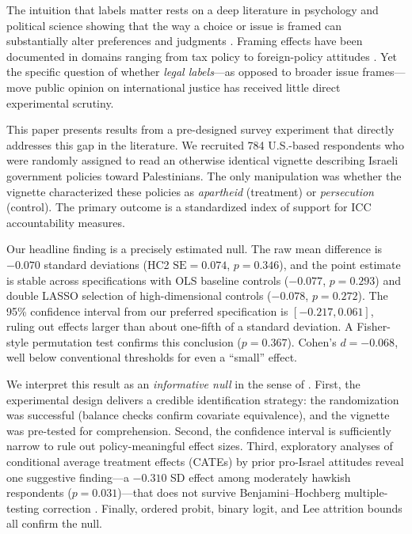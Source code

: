 \documentclass[12pt]{article}
\begin{document}
The intuition that labels matter rests on a deep literature in psychology and political science showing that the way a choice or issue is framed can substantially alter preferences and judgments \citep{kahneman1979prospect, chong2007framing, druckman2001implications}. Framing effects have been documented in domains ranging from tax policy \citep{nelson1997toward} to foreign-policy attitudes \citep{tomz2007experimental, kertzer2020experiments}. Yet the specific question of whether \emph{legal labels}---as opposed to broader issue frames---move public opinion on international justice has received little direct experimental scrutiny.

This paper presents results from a pre-designed survey experiment that directly addresses this gap in the literature. We recruited 784 U.S.-based respondents who were randomly assigned to read an otherwise identical vignette describing Israeli government policies toward Palestinians. The only manipulation was whether the vignette characterized these policies as \emph{apartheid} (treatment) or \emph{persecution} (control). The primary outcome is a standardized index of support for ICC accountability measures.

Our headline finding is a precisely estimated null. The raw mean difference is $-0.070$ standard deviations (HC2 $\text{SE} = 0.074$, $p = 0.346$), and the point estimate is stable across specifications with OLS baseline controls ($-0.077$, $p = 0.293$) and double LASSO selection of high-dimensional controls ($-0.078$, $p = 0.272$). The 95\% confidence interval from our preferred specification is $[-0.217, 0.061]$, ruling out effects larger than about one-fifth of a standard deviation. A Fisher-style permutation test confirms this conclusion ($p = 0.367$). Cohen's $d = -0.068$, well below conventional thresholds for even a ``small'' effect.

We interpret this result as an \emph{informative null} in the sense of \citet{lakens2017equivalence}. First, the experimental design delivers a credible identification strategy: the randomization was successful (balance checks confirm covariate equivalence), and the vignette was pre-tested for comprehension. Second, the confidence interval is sufficiently narrow to rule out policy-meaningful effect sizes. Third, exploratory analyses of conditional average treatment effects (CATEs) by prior pro-Israel attitudes reveal one suggestive finding---a $-0.310$ SD effect among moderately hawkish respondents ($p = 0.031$)---that does not survive Benjamini--Hochberg multiple-testing correction \citep{benjamini1995controlling}. Finally, ordered probit, binary logit, and Lee attrition bounds \citep{lee2009training} all confirm the null.
\end{document}
